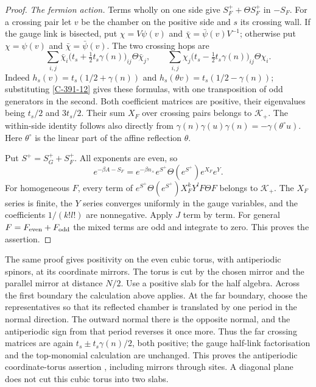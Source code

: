 \documentclass[11pt,letterpaper,reqno]{amsart}
\theoremstyle{definition}
\theoremstyle{remark}
\begin{document}
\begin{proof}
\emph{The fermion action.}
Terms wholly on one side give $S_F^++\Theta S_F^+$ in $-S_F$.
For a crossing pair let $v$ be the chamber on the positive side
and $s$ its crossing wall. If the gauge link is bisected, put
$\chi=V\psi(v)$ and $\bar\chi=\bar\psi(v)V^{-1}$; otherwise
put $\chi=\psi(v)$ and $\bar\chi=\bar\psi(v)$.
The two crossing hops are
\[
 \sum_{i,j}\bar\chi_i\bigl(t_s+\tfrac12t_s\gamma(n)\bigr)_{ij}
                           \Theta\bar\chi_j,
 \qquad
 \sum_{i,j}\chi_j\bigl(t_s-\tfrac12t_s\gamma(n)\bigr)_{ij}
                           \Theta\chi_i.
\]
Indeed $h_s(v)=t_s(1/2+\gamma(n))$ and
$h_s(\theta v)=t_s(1/2-\gamma(n))$; substituting
\eqref{C-391-12} gives these formulas, with one transposition of
odd generators in the second. Both coefficient matrices are
positive, their eigenvalues being $t_s/2$ and $3t_s/2$.
Their sum $X_F$ over crossing pairs belongs to $\mathcal K_+$.
The within-side identity follows also directly from
$\gamma(n)\gamma(u)\gamma(n)=-\gamma(\theta^\circ u)$.
Here $\theta^\circ$ is the linear part of the affine reflection $\theta$.

Put $S^+=S_G^++S_F^+$. All exponents are even, so
\[
 e^{-\beta A-S_F}
       =e^{-\beta n_\times}e^{S^+}\Theta(e^{S^+})e^{X_F}e^Y.
\]
For homogeneous $F$, every term of
$e^{S^+}\Theta(e^{S^+})X_F^kY^lF\Theta F$ belongs to
$\mathcal K_+$. The $X_F$ series is finite, the $Y$ series
converges uniformly in the gauge variables, and the coefficients
$1/(k!l!)$ are nonnegative. Apply $J$ term by term.
For general $F=F_{\rm even}+F_{\rm odd}$ the mixed terms are
odd and integrate to zero. This proves the assertion.
\end{proof}

The same proof gives positivity on the even cubic torus, with
antiperiodic spinors, at its coordinate mirrors. The torus is cut
by the chosen mirror and the parallel mirror at distance $N/2$.
Use a positive slab for the half algebra. Across the first boundary
the calculation above applies. At the far boundary, choose the
representatives so that its reflected chamber is translated by
one period in the normal direction. The outward normal there is
the opposite normal, and the antiperiodic sign from that period
reverses it once more. Thus the far crossing matrices are again
$t_s\pm t_s\gamma(n)/2$, both positive; the gauge half-link
factorisation and the top-monomial calculation are unchanged.
This proves the antiperiodic coordinate-torus assertion
\label{C-391-33}, including mirrors through sites.
A diagonal plane does not cut this cubic torus into two slabs.
\end{document}
